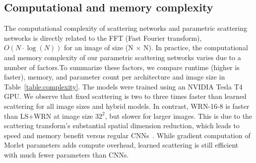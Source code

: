 \documentclass[10pt,twocolumn,letterpaper]{article}
\begin{document}
\subsection{Computational and memory complexity}
\label{sec:computation}
The computational complexity of scattering networks and parametric scattering networks is directly related to the FFT (Fast Fourier transform), $O(N{\cdot}\log(N))$ for an image of size (N $\times$ N). In practice, the computational and memory complexity of our parametric scattering networks varies due to a number of factors.To summarize these factors, we compare runtime (higher is faster), memory, and parameter count per architecture and image size in Table~\ref{table:complexity}. The models were trained using an NVIDIA Tesla T4 GPU. We observe that fixed scattering is two to three times faster than learned scattering for all image sizes and hybrid models. In contrast, WRN-16-8 is faster than LS+WRN at image size $32^2$, but slower for larger images. This is due to the scattering transform's substantial spatial dimension reduction, which leads to speed and memory benefit versus regular CNNs~\cite{mallat2012group}. While gradient computation of Morlet parameters adds compute overhead, learned scattering is still efficient with much fewer parameters than CNNs.     
\end{document}
